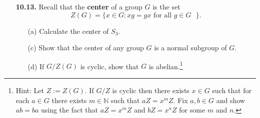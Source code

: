 \documentclass[12pt,reqno]{amsart}
\newcommand{\N}{\ensuremath{\mathbb{N}}}
\newcommand{\<}{\ensuremath{\langle}}
\renewcommand{\>}{\ensuremath{\rangle}}
\begin{document}
\begin{enumerate}
\medskip
{} 
We will solve this using\\[4pt]
\medskip
\begin{quote}
\emph{Pick an arbitrary element $g\in G$ and show that $gHg^{-1} = H$.}
\end{quote}
\medskip
First, given a subgroup $H\leq G$, and an arbitrary element $g\in G$, it is not hard to
see that the \emph{conjugate of $H$ by $g$}, which is defined by
\[
gHg^{-1} := \{ghg^{-1} | h\in H\},
\]
is also a subgroup of $G$.  Moreover, the function $h \mapsto ghg^{-1}$ is a
bijection.\footnote{In fact, as we will see later, $x\mapsto gxg^{-1}$ 
is an automorphism.}  
Therefore, $|H| = |gHg^{-1}|$.  If $|H| =k$ and if $H$ is the only
subgroup of $G$ of order $k$, then, since $|gHg^{-1}| = k$, we must have 
$H = gHg^{-1}$.
Since $g$ was arbitrary, this proves that $H$ is normal in $G$.
\qed

\bigskip

\item[{\bf 10.13.}]
Recall that the {\bf center} of a group $G$ is the set 
\[
Z(G) = \{ x \in G : xg = gx \text{ for all $g \in G$ } \}.
\]
\begin{enumerate}
 
 \item[(a)]
Calculate the center of $S_3$.
 
 
 \item[(c)]
Show that the center of any group $G$ is a normal subgroup of $G$. 
 
 \item[(d)]
If $G / Z(G)$ is cyclic, show that $G$ is abelian.\footnote{Hint: Let $Z := Z(G)$.  If
  $G/Z$ is cyclic then there exists $x\in G$ such that for each $a\in G$ 
  there exists $m\in \N$ such that $aZ = x^mZ$.
  Fix $a, b\in G$ and show $ab = ba$ using the fact that $aZ = x^mZ$ and
  $bZ = x^nZ$ for some $m$ and $n$.}
 
\end{enumerate}

\newpage


\end{enumerate}
\end{document}
